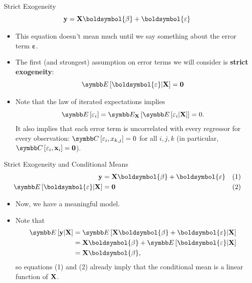 \documentclass[aspectratio=169,11pt]{beamer}
\begin{document}
\begin{frame}{Strict Exogeneity}
	\begin{equation*}
		{\bf y}= {\bf X} \boldsymbol{\beta} + \boldsymbol{\varepsilon}
	\end{equation*}
\begin{itemize}
	\item This equation doesn't mean much until we say something about the error term $\boldsymbol{\varepsilon}$.

	\item The first (and strongest) assumption on error terms we will consider is {\bf strict exogeneity}:\[
		\E\left[\boldsymbol{\varepsilon} | {\bf X} \right] = {\bf 0}
	\]

	\item Note that the law of iterated expectations implies\[
		\E\left[\varepsilon_i\right] = \E_{{\bf X}} \left[\E\left[\varepsilon_i | {\bf X}\right] \right] = 0.
	\]
	It also implies that each error term is uncorrelated with every regressor for every observation: $\Cov\left[\varepsilon_{i},x_{k,j}\right]=0$ 
	for all $i,j,k$ (in particular, $\Cov\left[\varepsilon_{i}, {\bf x}_{i}\right]={\bf 0}$).
\end{itemize}
\end{frame}


\begin{frame}{Strict Exogeneity and Conditional Means}
\begin{align*}
{\bf y} & =  {\bf X}\boldsymbol{\beta}+\boldsymbol{\varepsilon}	& (1)\\
\E\left[\boldsymbol{\varepsilon}|{\bf X}\right] & =  {\bf 0}						& (2)
\end{align*}
\begin{itemize}
	\item Now, we have a meaningful model. 
	\item Note that
\begin{align*}
\E\left[{\bf y}|{\bf X}\right] & =  \E\left[{\bf X}\boldsymbol{\beta}+\boldsymbol{\varepsilon}|{\bf X}\right]\\
 & =  {\bf X}\boldsymbol{\beta}+\E\left[\boldsymbol{\varepsilon}|{\bf X}\right]\\
 &  = {\bf X}\boldsymbol{\beta},
\end{align*}
so equations (1) and (2) already imply that the conditional mean is a linear function of ${\bf X}$.
\end{itemize}
\end{frame}
\end{document}
